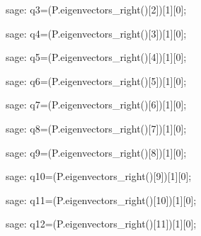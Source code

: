 \begin{sagecommandline}
    sage: q3=(P.eigenvectors_right()[2])[1][0];
\end{sagecommandline}

\begin{sagecommandline}
    sage: q4=(P.eigenvectors_right()[3])[1][0];
\end{sagecommandline}

\begin{sagecommandline}
    sage: q5=(P.eigenvectors_right()[4])[1][0];
\end{sagecommandline}

\begin{sagecommandline}
    sage: q6=(P.eigenvectors_right()[5])[1][0];
\end{sagecommandline}

\begin{sagecommandline}
    sage: q7=(P.eigenvectors_right()[6])[1][0];
\end{sagecommandline}

\begin{sagecommandline}
    sage: q8=(P.eigenvectors_right()[7])[1][0];
\end{sagecommandline}

\begin{sagecommandline}
    sage: q9=(P.eigenvectors_right()[8])[1][0];
\end{sagecommandline}

\begin{sagecommandline}
    sage: q10=(P.eigenvectors_right()[9])[1][0];
\end{sagecommandline}

\begin{sagecommandline}
    sage: q11=(P.eigenvectors_right()[10])[1][0];
\end{sagecommandline}

\begin{sagecommandline}
    sage: q12=(P.eigenvectors_right()[11])[1][0];
\end{sagecommandline}


